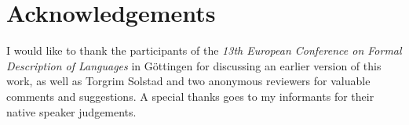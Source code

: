 \documentclass[output=paper,
colorlinks,
citecolor=brown,
newtxmath
]{langscibook}
\begin{document}
\section*{Acknowledgements}
I would like to thank the participants of the \textit{13th European Conference on
Formal Description of  Languages} in Göttingen for discussing an earlier version of this work, as well as Torgrim Solstad and two anonymous reviewers for valuable comments and suggestions. A special thanks goes to my informants for their native speaker judgements.
%
\sloppy
\printbibliography[heading=subbibliography,notkeyword=this]
\end{document}
